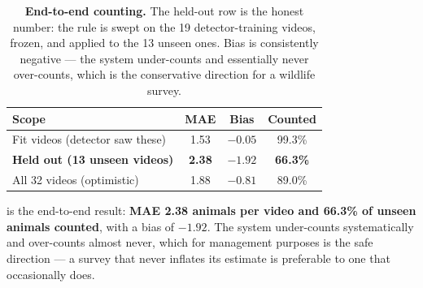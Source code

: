 \begin{table}[t]
\centering\small
\setlength{\tabcolsep}{4pt}
\begin{tabular}{lccc}
\toprule
Scope & MAE & Bias & Counted \\
\midrule
Fit videos (detector saw these) & 1.53 & $-0.05$ & 99.3\% \\
\textbf{Held out (13 unseen videos)} & \textbf{2.38} & $\mathbf{-1.92}$ & \textbf{66.3\%} \\
All 32 videos (optimistic) & 1.88 & $-0.81$ & 89.0\% \\
\bottomrule
\end{tabular}
\caption{\textbf{End-to-end counting.} The held-out row is the honest number: the rule is
swept on the 19 detector-training videos, frozen, and applied to the 13 unseen ones. Bias is
consistently negative --- the system under-counts and essentially never over-counts, which is
the conservative direction for a wildlife survey.}
\label{tab:counting}
\end{table}

 is the end-to-end result: \textbf{MAE 2.38 animals per video and 66.3\%
of unseen animals counted}, with a bias of $-1.92$. The system under-counts systematically
and over-counts almost never, which for management purposes is the safe direction --- a
survey that never inflates its estimate is preferable to one that occasionally does.

